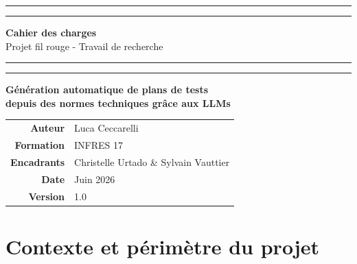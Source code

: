 \documentclass[12pt, a4paper]{article}
\begin{document}
\begin{titlepage}
  \centering
  \vspace*{1.5cm}

  {\color{primary}\rule{\linewidth}{1.5pt}}\vspace{0.4cm}
  {\color{primary}\rule{\linewidth}{0.4pt}}

  \vspace{1cm}
  {\Huge\bfseries\color{primary} Cahier des charges}\\[0.4cm]
  {\Large\color{gray} Projet fil rouge - Travail de recherche}

  \vspace{0.8cm}
  {\color{primary}\rule{\linewidth}{0.4pt}}\vspace{0.2cm}
  {\color{primary}\rule{\linewidth}{1.5pt}}

  \vspace{2cm}

  \begin{tcolorbox}[
    colback=primary!10, colframe=primary,
    arc=6pt, boxrule=1pt,
    width=0.9\linewidth
  ]
    \centering
    {\large\bfseries\color{primary} Génération automatique de plans de tests}\\[0.3em]
    {\large\bfseries\color{primary} depuis des normes techniques grâce aux LLMs}
  \end{tcolorbox}

  \vspace{2.5cm}

  \begin{tabular}{rl}
    \textbf{Auteur}        & Luca Ceccarelli \\[0.4em]
    \textbf{Formation}     & INFRES 17 \\[0.4em]
    \textbf{Encadrants}    & Christelle Urtado \& Sylvain Vauttier \\[0.4em]
    \textbf{Date}          & Juin 2026 \\[0.4em]
    \textbf{Version}       & 1.0 \\
  \end{tabular}

\end{titlepage}

\tableofcontents
\newpage

\section{Contexte et périmètre du projet}
\end{document}

